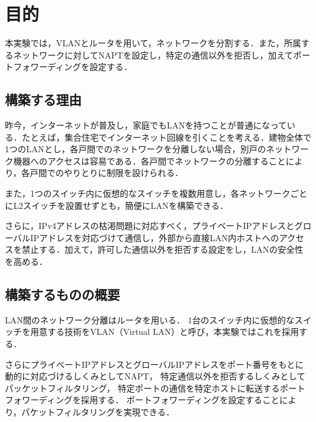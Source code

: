\section{目的}
本実験では，VLANとルータを用いて，ネットワークを分割する．また，所属するネットワークに対してNAPTを設定し，特定の通信以外を拒否し，加えてポートフォワーディングを設定する．
\subsection{構築する理由}
昨今，インターネットが普及し，家庭でもLANを持つことが普通になっている．たとえば，集合住宅でインターネット回線を引くことを考える．建物全体で1つのLANとし，各戸間でのネットワークを分離しない場合，別戸のネットワーク機器へのアクセスは容易である．各戸間でネットワークの分離することにより，各戸間でのやりとりに制限を設けられる．\par
また，1つのスイッチ内に仮想的なスイッチを複数用意し，各ネットワークごとにL2スイッチを設置せずとも，簡便にLANを構築できる．\par
さらに，IPv4アドレスの枯渇問題に対応すべく，プライベートIPアドレスとグローバルIPアドレスを対応づけて通信し，外部から直接LAN内ホストへのアクセスを禁止する．加えて，許可した通信以外を拒否する設定をし，LANの安全性を高める．
\subsection{構築するものの概要}
LAN間のネットワーク分離はルータを用いる．
1台のスイッチ内に仮想的なスイッチを用意する技術をVLAN（Virtual LAN）と呼び，本実験ではこれを採用する．\par
さらにプライベートIPアドレスとグローバルIPアドレスをポート番号をもとに動的に対応づけるしくみとしてNAPT，
特定通信以外を拒否するしくみとしてパッケットフィルタリング，
特定ポートの通信を特定ホストに転送するポートフォワーディングを採用する．
ポートフォワーディングを設定することにより，パケットフィルタリングを実現できる．